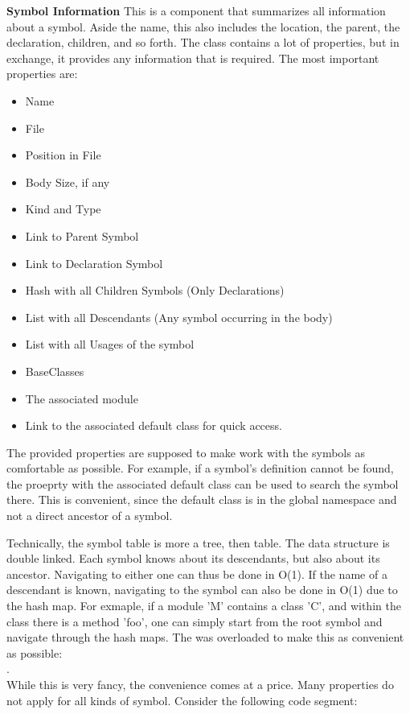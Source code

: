\textbf{Symbol Information}
This is a component that summarizes all information about a symbol.
Aside the name, this also includes the location, the parent, the declaration, children, and so forth.
The class contains a lot of properties, but in exchange, it provides any information that is required.
The most important properties are:
\begin{itemize}
    \item Name
    \item File
    \item Position in File
    \item Body Size, if any
    \item Kind and Type
    \item Link to Parent Symbol
    \item Link to Declaration Symbol
    \item Hash with all Children Symbols (Only Declarations)
    \item List with all Descendants (Any symbol occurring in the body)
    \item List with all Usages of the symbol
    \item BaseClasses
    \item The associated module
    \item Link to the associated default class for quick access.
\end{itemize}
The provided properties are supposed to make work with the symbols as comfortable as possible.
For example, if a symbol's definition cannot be found, the proeprty with the associated default class can be used to search the symbol there.
This is convenient, since the default class is in the global namespace and not a direct ancestor of a symbol.

Technically, the symbol table is more a tree, then table.
The data structure is double linked.
Each symbol knows about its descendants, but also about its ancestor.
Navigating to either one can thus be done in O(1).
If the name of a descendant is known, navigating to the symbol can also be done in O(1) due to the hash map.
For exmaple, if a module 'M' contains a class 'C', and within the class there is a method 'foo', one can simply start from the root symbol and navigate through the hash maps.
The \code{[]} was overloaded to make this as convenient as possible:\\
.\\

While this is very fancy, the convenience comes at a price.
Many properties do not apply for all kinds of symbol.
Consider the following code segment:

